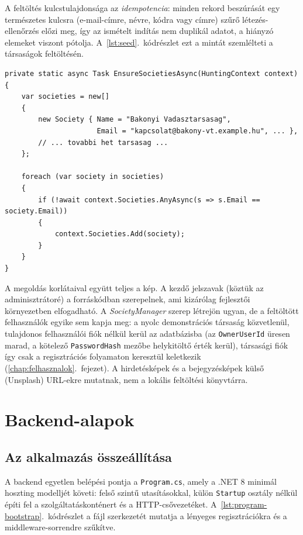 A feltöltés kulcstulajdonsága az \emph{idempotencia}: minden rekord beszúrását egy természetes
kulcsra (e-mail-címre, névre, kódra vagy címre) szűrő létezés-ellenőrzés előzi meg, így az
ismételt indítás nem duplikál adatot, a hiányzó elemeket viszont pótolja.
A~\ref{lst:seed}.~kódrészlet ezt a mintát szemlélteti a társaságok feltöltésén.

\begin{lstlisting}[language={[Sharp]C}, caption={Idempotens adatfeltöltés a \texttt{SeedData} osztályban (kivonat)}, label={lst:seed}]
private static async Task EnsureSocietiesAsync(HuntingContext context)
{
    var societies = new[]
    {
        new Society { Name = "Bakonyi Vadasztarsasag",
                      Email = "kapcsolat@bakony-vt.example.hu", ... },
        // ... tovabbi het tarsasag ...
    };

    foreach (var society in societies)
    {
        if (!await context.Societies.AnyAsync(s => s.Email == society.Email))
        {
            context.Societies.Add(society);
        }
    }
}
\end{lstlisting}

A megoldás korlátaival együtt teljes a kép. A kezdő jelszavak (köztük az adminisztrátoré) a
forráskódban szerepelnek, ami kizárólag fejlesztői környezetben elfogadható. A
\emph{SocietyManager} szerep létrejön ugyan, de a feltöltött felhasználók egyike sem kapja meg: a
nyolc demonstrációs társaság közvetlenül, tulajdonos felhasználói fiók nélkül kerül az adatbázisba
(az \texttt{OwnerUserId} üresen marad, a kötelező \texttt{PasswordHash} mezőbe helykitöltő érték
kerül), társasági fiók így csak a regisztrációs folyamaton keresztül keletkezik
(\ref{chap:felhasznalok}.~fejezet). A hirdetésképek és a bejegyzésképek külső (Unsplash) URL-ekre
mutatnak, nem a lokális feltöltési könyvtárra.

\section{Backend-alapok}
\label{sec:alapok-backend}

\subsection{Az alkalmazás összeállítása}

A backend egyetlen belépési pontja a \texttt{Program.cs}, amely a .NET 8 minimál hoszting
modelljét követi: felső szintű utasításokkal, külön \texttt{Startup} osztály nélkül építi fel a
szolgáltatáskonténert és a HTTP-csővezetéket. A~\ref{lst:program-bootstrap}.~kódrészlet a fájl
szerkezetét mutatja a lényeges regisztrációkra és a middleware-sorrendre szűkítve.

